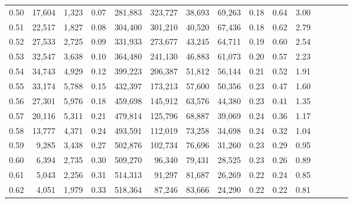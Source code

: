\begin{tabular}{rrrcrrrrrrrrrrr}
0.50 &  17,604 &   1,323 &                                       0.07 &  281,883 &  323,727 &   38,693 &  69,263 &  0.18 &  0.64 &                         3.00 \\
0.51 &  22,517 &   1,827 &                                       0.08 &  304,400 &  301,210 &   40,520 &  67,436 &  0.18 &  0.62 &                         2.79 \\
0.52 &  27,533 &   2,725 &                                       0.09 &  331,933 &  273,677 &   43,245 &  64,711 &  0.19 &  0.60 &                         2.54 \\
0.53 &  32,547 &   3,638 &                                       0.10 &  364,480 &  241,130 &   46,883 &  61,073 &  0.20 &  0.57 &                         2.23 \\
0.54 &  34,743 &   4,929 &                                       0.12 &  399,223 &  206,387 &   51,812 &  56,144 &  0.21 &  0.52 &                         1.91 \\
0.55 &  33,174 &   5,788 &                                       0.15 &  432,397 &  173,213 &   57,600 &  50,356 &  0.23 &  0.47 &                         1.60 \\
0.56 &  27,301 &   5,976 &                                       0.18 &  459,698 &  145,912 &   63,576 &  44,380 &  0.23 &  0.41 &                         1.35 \\
0.57 &  20,116 &   5,311 &                                       0.21 &  479,814 &  125,796 &   68,887 &  39,069 &  0.24 &  0.36 &                         1.17 \\
0.58 &  13,777 &   4,371 &                                       0.24 &  493,591 &  112,019 &   73,258 &  34,698 &  0.24 &  0.32 &                         1.04 \\
0.59 &   9,285 &   3,438 &                                       0.27 &  502,876 &  102,734 &   76,696 &  31,260 &  0.23 &  0.29 &                         0.95 \\
0.60 &   6,394 &   2,735 &                                       0.30 &  509,270 &   96,340 &   79,431 &  28,525 &  0.23 &  0.26 &                         0.89 \\
0.61 &   5,043 &   2,256 &                                       0.31 &  514,313 &   91,297 &   81,687 &  26,269 &  0.22 &  0.24 &                         0.85 \\
0.62 &   4,051 &   1,979 &                                       0.33 &  518,364 &   87,246 &   83,666 &  24,290 &  0.22 &  0.22 &                         0.81 \\

\end{tabular}
